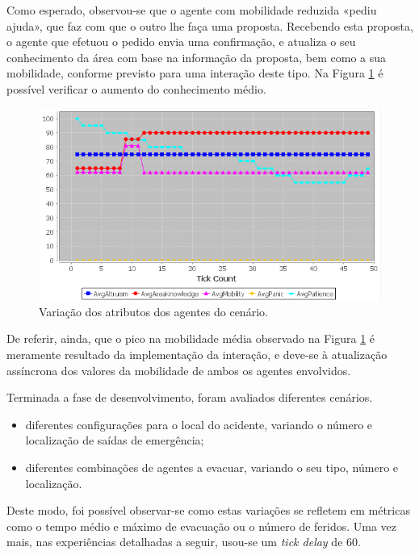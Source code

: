 \documentclass[12pt]{article}
\begin{document}
\begin{titlepage}
\begin{itemize}
Como esperado, observou-se que o agente com mobilidade reduzida «pediu ajuda», que faz com que o outro lhe faça uma proposta. Recebendo esta proposta, o agente que efetuou o pedido envia uma confirmação, e atualiza o seu conhecimento da área com base na informação da proposta, bem como a sua mobilidade, conforme previsto para uma interação deste tipo. Na Figura \ref{help_graph} é possível verificar o aumento do conhecimento médio.

\begin{figure}[H]
	\centering
	\includegraphics{help_test.png}
	\caption{Variação dos atributos dos agentes do cenário.}
	\label{help_graph}
\end{figure}
	
	De referir, ainda, que o pico na mobilidade média observado na Figura \ref{help_graph} é meramente resultado da implementação da interação, e deve-se à atualização assíncrona dos valores da mobilidade de ambos os agentes envolvidos.
	
\end{itemize}


Terminada a fase de desenvolvimento, foram avaliados diferentes cenários.
\begin{itemize}
	\item diferentes configurações para o local do acidente, variando o número e localização de saídas de emergência;
	\item diferentes combinações de agentes a evacuar, variando o seu tipo, número e localização.
\end{itemize}

Deste modo, foi possível observar-se como estas variações se refletem em métricas como o tempo médio e máximo de evacuação ou o número de feridos. Uma vez mais, nas experiências detalhadas a seguir, usou-se um \textit{tick delay} de 60.


\end{titlepage}
\end{document}
